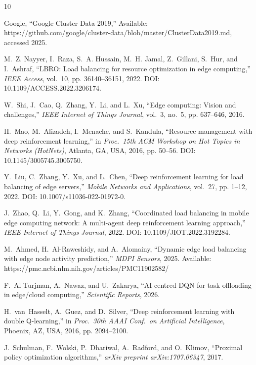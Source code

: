 \documentclass[conference]{IEEEtran}
\begin{document}
\begin{thebibliography}{10}

Google,
``Google Cluster Data 2019,''
Available: https://github.com/google/cluster-data/blob/master/ClusterData2019.md,
accessed 2025.

M.~Z. Nayyer, I.~Raza, S.~A. Hussain, M.~H. Jamal, Z.~Gillani,
S.~Hur, and I.~Ashraf,
``LBRO: Load balancing for resource optimization in edge computing,''
\emph{IEEE Access}, vol.~10, pp. 36140--36151, 2022.
DOI: 10.1109/ACCESS.2022.3206174.

W.~Shi, J.~Cao, Q.~Zhang, Y.~Li, and L.~Xu,
``Edge computing: Vision and challenges,''
\emph{IEEE Internet of Things Journal}, vol.~3, no.~5,
pp. 637--646, 2016.

H.~Mao, M.~Alizadeh, I.~Menache, and S.~Kandula,
``Resource management with deep reinforcement learning,''
in \emph{Proc.\ 15th ACM Workshop on Hot Topics in Networks (HotNets)},
Atlanta, GA, USA, 2016, pp. 50--56.
DOI: 10.1145/3005745.3005750.

Y.~Liu, C.~Zhang, Y.~Xu, and L.~Chen,
``Deep reinforcement learning for load balancing of edge servers,''
\emph{Mobile Networks and Applications}, vol.~27, pp. 1--12, 2022.
DOI: 10.1007/s11036-022-01972-0.

J.~Zhao, Q.~Li, Y.~Gong, and K.~Zhang,
``Coordinated load balancing in mobile edge computing network:
A multi-agent deep reinforcement learning approach,''
\emph{IEEE Internet of Things Journal}, 2022.
DOI: 10.1109/JIOT.2022.3192284.

M.~Ahmed, H.~Al-Raweshidy, and A.~Alomainy,
``Dynamic edge load balancing with edge node activity prediction,''
\emph{MDPI Sensors}, 2025.
Available: https://pmc.ncbi.nlm.nih.gov/articles/PMC11902582/

F.~Al-Turjman, A.~Nawaz, and U.~Zakarya,
``AI-centred DQN for task offloading in edge/cloud computing,''
\emph{Scientific Reports}, 2026.

H.~van~Hasselt, A.~Guez, and D.~Silver,
``Deep reinforcement learning with double Q-learning,''
in \emph{Proc.\ 30th AAAI Conf.\ on Artificial Intelligence},
Phoenix, AZ, USA, 2016, pp. 2094--2100.

J.~Schulman, F.~Wolski, P.~Dhariwal, A.~Radford, and O.~Klimov,
``Proximal policy optimization algorithms,''
\textit{arXiv preprint arXiv:1707.06347}, 2017.

\end{thebibliography}
\end{document}

